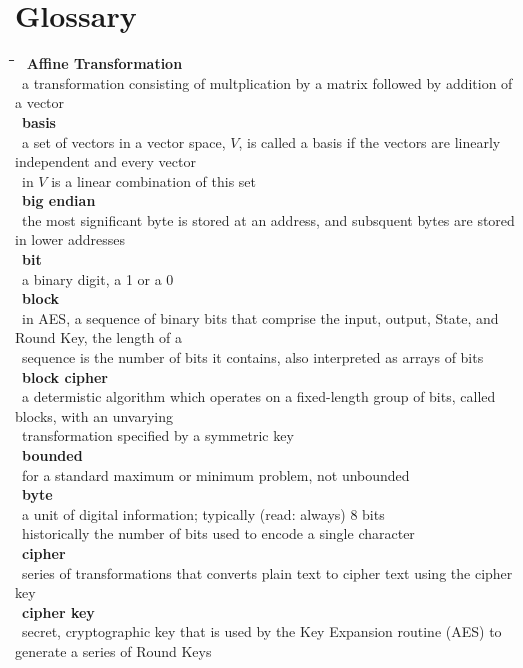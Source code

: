\documentclass[10pt,letterpaper]{scrartcl}
\newcommand{\tbul}{\textbullet}
\newcommand{\tend}{\>\textendash}
\newcommand{\tabDef}{\hspace{2em}\=\hspace{2em}\=\hspace{2em}\=\hspace{2em}\=\kill}
\begin{document}
\newpage\section{Glossary}\begin{tabbing}\tabDef 
\tbul\ \textbf{Affine Transformation} \\
\tend\ a transformation consisting of multplication by a matrix followed by addition of a vector \\
\tbul\ \textbf{basis} \\
\tend\ a set of vectors in a vector space, $V$, is called a basis if the vectors are linearly independent and every vector \\ \>\ in $V$ is a linear combination of this set \\
\tbul\ \textbf{big endian} \\
\tend\ the most significant byte is stored at an address, and subsquent bytes are stored in lower addresses\\
\tbul\ \textbf{bit} \\
\tend\ a binary digit, a 1 or a 0 \\
\tbul\ \textbf{block} \\
\tend\ in AES, a sequence of binary bits that comprise the input, output, State, and Round Key, the length of a \\ \>\ sequence is the number of bits it contains, also interpreted as arrays of bits \\
\tbul\ \textbf{block cipher} \\
\tend\ a determistic algorithm which operates on a fixed-length group of bits, called blocks, with an unvarying \\ \>\ transformation specified by a symmetric key \\
\tbul\ \textbf{bounded} \\
\tend\ for a standard maximum or minimum problem, not unbounded \\
\tbul\ \textbf{byte} \\
\tend\ a unit of digital information; typically (read: always) 8 bits \\
\tend\ historically the number of bits used to encode a single character \\
\tbul\ \textbf{cipher} \\
\tend\ series of transformations that converts plain text to cipher text using the cipher key \\
\tbul\ \textbf{cipher key} \\ 
\tend\ secret, cryptographic key that is used by the Key Expansion routine (AES) to generate a series of Round Keys \\

\end{tabbing}
\end{document}

